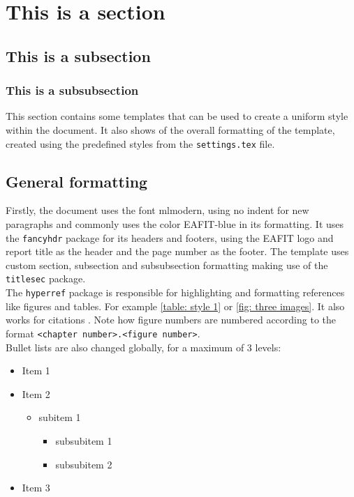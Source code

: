 \section{This is a section}
\subsection{This is a subsection}

\subsubsection{This is a subsubsection}
This section contains some templates that can be used to create a uniform style within the document. It also shows of the overall formatting of the template, created using the predefined styles from the \texttt{settings.tex} file.

\subsection{General formatting}
Firstly, the document uses the font mlmodern, using no indent for new paragraphs and commonly uses the color \textcolor{EAFIT-blue}{EAFIT-blue} in its formatting. It uses the \texttt{fancyhdr} package for its headers and footers, using the EAFIT logo and report title as the header and the page number as the footer. The template uses custom section, subsection and subsubsection formatting making use of the \texttt{titlesec} package.\\
The \texttt{hyperref} package is responsible for highlighting and formatting references like figures and tables. For example \cref{table: style 1} or \cref{fig: three images}. It also works for citations \cite{texbook}. Note how figure numbers are numbered according to the format \texttt{<chapter number>.<figure number>}.\\

Bullet lists are also changed globally, for a maximum of 3 levels:

\begin{itemize}
    \item Item 1
    \item Item 2
    \begin{itemize}
        \item subitem 1
        \begin{itemize}
            \item subsubitem 1
            \item subsubitem 2
        \end{itemize}
    \end{itemize}
    \item Item 3
\end{itemize}

